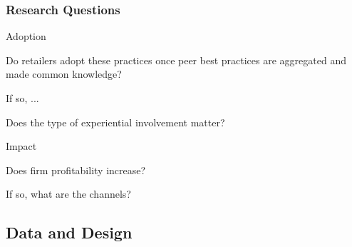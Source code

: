\documentclass[hideothersubsections, usenames,dvipsnames,11pt]{beamer}
\newenvironment{itemize_3pt}{\itemize\addtolength{\itemsep}{3pt}}{\enditemize}
\begin{document}
\begin{frame}
\frametitle{Research Questions}
	\begin{itemize_3pt}
	\item \textcolor{bdf}{Adoption}
		\begin{itemize_3pt}
		\item Do retailers adopt these practices once peer best practices are aggregated and made common knowledge?
		\item If so, ...
			\begin{itemize_3pt}
			\item Does the type of experiential involvement matter?
			\end{itemize_3pt}
		\end{itemize_3pt}
    \vspace{0.3in}
	\item \textcolor{bdf}{Impact}
		\begin{itemize_3pt}
		\item Does firm profitability increase?
		\item If so, what are the channels?
		\end{itemize_3pt}
	\end{itemize_3pt}
\end{frame}

\subsection{Data and Design}
\end{document}
